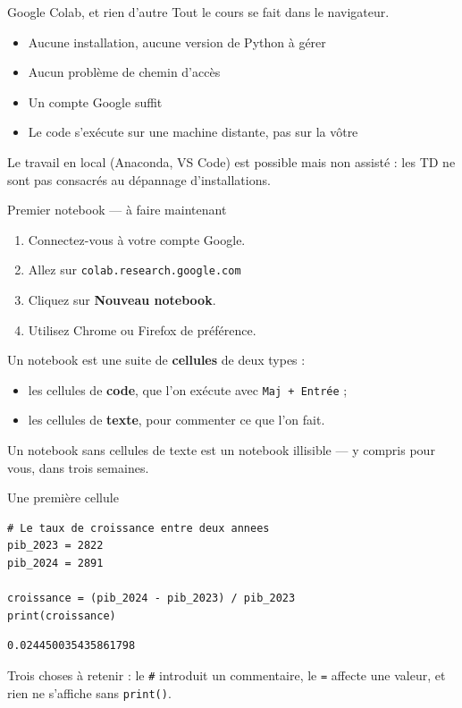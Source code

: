 \documentclass[10pt,aspectratio=169]{beamer}
\begin{document}
\begin{frame}{Google Colab, et rien d'autre}
Tout le cours se fait dans le navigateur.

\vspace{1em}
\begin{itemize}
  \item Aucune installation, aucune version de Python à gérer
  \item Aucun problème de chemin d'accès
  \item Un compte Google suffit
  \item Le code s'exécute sur une machine distante, pas sur la vôtre
\end{itemize}

\vspace{1.2em}
Le travail en local (Anaconda, VS Code) est possible mais \alert{non assisté} : les TD ne sont pas consacrés au dépannage d'installations.
\end{frame}

\begin{frame}{Premier notebook --- à faire maintenant}
\begin{enumerate}
  \item Connectez-vous à votre compte Google.
  \item Allez sur \texttt{colab.research.google.com}
  \item Cliquez sur \textbf{Nouveau notebook}.
  \item Utilisez Chrome ou Firefox de préférence.
\end{enumerate}

\vspace{1.2em}
Un notebook est une suite de \textbf{cellules} de deux types :
\begin{itemize}
  \item les cellules de \textbf{code}, que l'on exécute avec \texttt{Maj + Entrée} ;
  \item les cellules de \textbf{texte}, pour commenter ce que l'on fait.
\end{itemize}

\vspace{0.8em}
Un notebook sans cellules de texte est un notebook illisible --- y compris pour vous, dans trois semaines.
\end{frame}

\begin{frame}[fragile]{Une première cellule}
\begin{lstlisting}
# Le taux de croissance entre deux annees
pib_2023 = 2822
pib_2024 = 2891

croissance = (pib_2024 - pib_2023) / pib_2023
print(croissance)
\end{lstlisting}

\vspace{0.5em}
\begin{lstlisting}
0.024450035435861798
\end{lstlisting}

\vspace{1em}
Trois choses à retenir : le \texttt{\#} introduit un commentaire, le \texttt{=} affecte une valeur, et rien ne s'affiche sans \texttt{print()}.
\end{frame}
\end{document}
